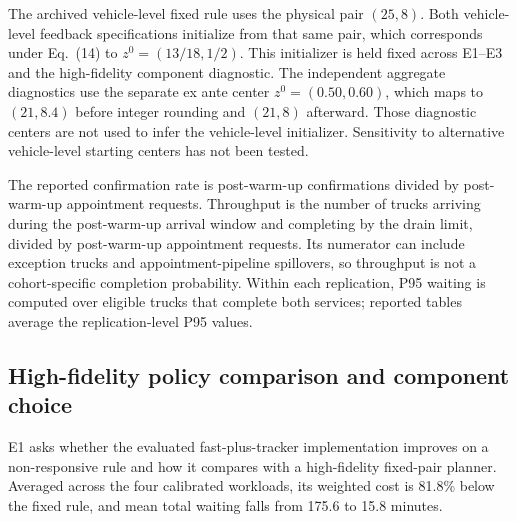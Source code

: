 \documentclass[preprint,12pt,authoryear,a4paper]{elsarticle}
\begin{document}
The archived vehicle-level fixed rule uses the physical pair \((25,8)\). Both vehicle-level feedback specifications initialize from that same pair, which corresponds under Eq.~(14) to \(z^0=(13/18,1/2)\). This initializer is held fixed across E1--E3 and the high-fidelity component diagnostic. The independent aggregate diagnostics use the separate ex ante center \(z^0=(0.50,0.60)\), which maps to \((21,8.4)\) before integer rounding and \((21,8)\) afterward. Those diagnostic centers are not used to infer the vehicle-level initializer. Sensitivity to alternative vehicle-level starting centers has not been tested.

The reported confirmation rate is post-warm-up confirmations divided by post-warm-up appointment requests. Throughput is the number of trucks arriving during the post-warm-up arrival window and completing by the drain limit, divided by post-warm-up appointment requests. Its numerator can include exception trucks and appointment-pipeline spillovers, so throughput is not a cohort-specific completion probability. Within each replication, P95 waiting is computed over eligible trucks that complete both services; reported tables average the replication-level P95 values.

\subsection{High-fidelity policy comparison and component choice}
\label{subsec:6-3-main-policy-comparison-under-calibrated-workloads}

E1 asks whether the evaluated fast-plus-tracker implementation improves on a non-responsive rule and how it compares with a high-fidelity fixed-pair planner. Averaged across the four calibrated workloads, its weighted cost is 81.8\% below the fixed rule, and mean total waiting falls from 175.6 to 15.8 minutes.
\end{document}
